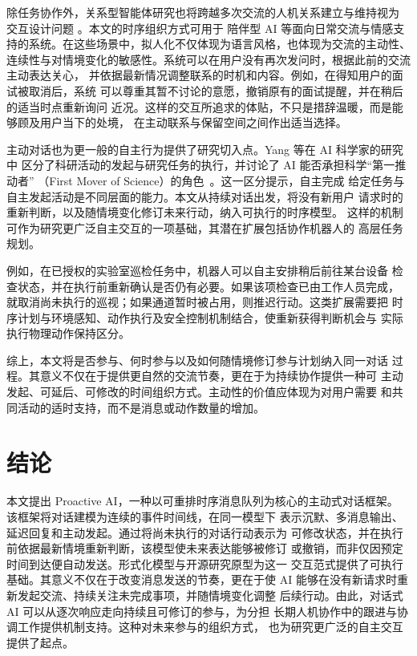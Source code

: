 \documentclass[manuscript,nonacm]{acmart}
\begin{document}
除任务协作外，关系型智能体研究也将跨越多次交流的人机关系建立与维持视为
交互设计问题 \cite{bickmore2005relationships}。本文的时序组织方式可用于
陪伴型 AI 等面向日常交流与情感支持的系统。在这些场景中，拟人化不仅体现为语言风格，也体现为交流的主动性、
连续性与对情境变化的敏感性。系统可以在用户没有再次发问时，根据此前的交流主动表达关心，
并依据最新情况调整联系的时机和内容。例如，在得知用户的面试被取消后，系统
可以尊重其暂不讨论的意愿，撤销原有的面试提醒，并在稍后的适当时点重新询问
近况。这样的交互所追求的体贴，不只是措辞温暖，而是能够顾及用户当下的处境，
在主动联系与保留空间之间作出适当选择。

主动对话也为更一般的自主行为提供了研究切入点。Yang 等在 AI 科学家的研究中
区分了科研活动的发起与研究任务的执行，并讨论了 AI 能否承担科学“第一推动者”
（First Mover of Science）的角色~\cite{yang2023ai}。这一区分提示，自主完成
给定任务与自主发起活动是不同层面的能力。本文从持续对话出发，将没有新用户
请求时的重新判断，以及随情境变化修订未来行动，纳入可执行的时序模型。
这样的机制可作为研究更广泛自主交互的一项基础，其潜在扩展包括协作机器人的
高层任务规划。

例如，在已授权的实验室巡检任务中，机器人可以自主安排稍后前往某台设备
检查状态，并在执行前重新确认是否仍有必要。如果该项检查已由工作人员完成，
就取消尚未执行的巡视；如果通道暂时被占用，则推迟行动。这类扩展需要把
时序计划与环境感知、动作执行及安全控制机制结合，使重新获得判断机会与
实际执行物理动作保持区分。

综上，本文将是否参与、何时参与以及如何随情境修订参与计划纳入同一对话
过程。其意义不仅在于提供更自然的交流节奏，更在于为持续协作提供一种可
主动发起、可延后、可修改的时间组织方式。主动性的价值应体现为对用户需要
和共同活动的适时支持，而不是消息或动作数量的增加。

\section{结论}

本文提出 Proactive AI，一种以可重排时序消息队列为核心的主动式对话框架。
该框架将对话建模为连续的事件时间线，在同一模型下
表示沉默、多消息输出、延迟回复和主动发起。通过将尚未执行的对话行动表示为
可修改状态，并在执行前依据最新情境重新判断，该模型使未来表达能够被修订
或撤销，而非仅因预定时间到达便自动发送。形式化模型与开源研究原型为这一
交互范式提供了可执行基础。其意义不仅在于改变消息发送的节奏，更在于使 AI
能够在没有新请求时重新发起交流、持续关注未完成事项，并随情境变化调整
后续行动。由此，对话式 AI 可以从逐次响应走向持续且可修订的参与，为分担
长期人机协作中的跟进与协调工作提供机制支持。这种对未来参与的组织方式，
也为研究更广泛的自主交互提供了起点。
\end{document}
